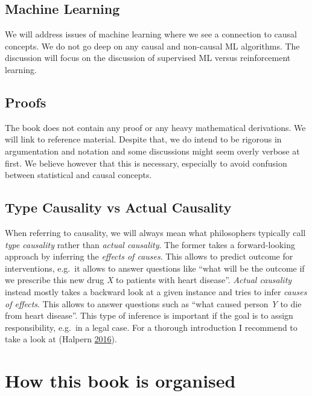 \documentclass[
]{book}
\theoremstyle{definition}
\theoremstyle{definition}
\theoremstyle{definition}
\theoremstyle{remark}
\begin{document}
\hypertarget{machine-learning}{%
\subsection{Machine Learning}\label{machine-learning}}

We will address issues of machine learning where we see a connection to causal concepts. We do not go deep on any causal and non-causal ML algorithms. The discussion will focus on the discussion of supervised ML versus reinforcement learning.

\hypertarget{proofs}{%
\subsection{Proofs}\label{proofs}}

The book does not contain any proof or any heavy mathematical derivations. We will link to reference material. Despite that, we do intend to be rigorous in argumentation and notation and some discussions might seem overly verbose at first. We believe however that this is necessary, especially to avoid confusion between statistical and causal concepts.

\hypertarget{type-causality-vs-actual-causality}{%
\subsection{Type Causality vs Actual Causality}\label{type-causality-vs-actual-causality}}

When referring to causality, we will always mean what philosophers typically call \emph{type causality} rather than \emph{actual causality}. The former takes a forward-looking approach by inferring the \emph{effects of causes}. This allows to predict outcome for interventions, e.g.~it allows to answer questions like ``what will be the outcome if we prescribe this new drug \emph{X} to patients with heart disease''. \emph{Actual causality} instead mostly takes a backward look at a given instance and tries to infer \emph{causes of effects}. This allows to answer questions such as ``what caused person \emph{Y} to die from heart disease''. This type of inference is important if the goal is to assign responsibility, e.g.~in a legal case. For a thorough introduction I recommend to take a look at (Halpern \protect\hyperlink{ref-halpern2016}{2016}).

\hypertarget{how-this-book-is-organised}{%
\section{How this book is organised}\label{how-this-book-is-organised}}
\end{document}
